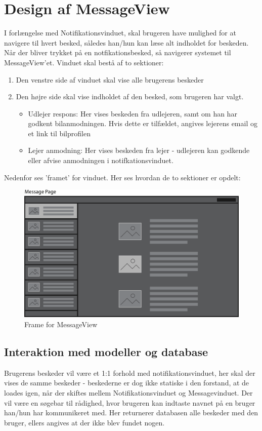 \documentclass[SoftwareDesign/SoftwareDesign_main.tex]{subfiles}
\begin{document}
\section{Design af MessageView}
I forlængelse med Notifikationsvinduet, skal brugeren have mulighed for at navigere til hvert besked, således han/hun kan læse alt indholdet for beskeden. Når der bliver trykket på en notfikationsbesked, så navigerer systemet til MessageView'et. Vinduet skal bestå af to sektioner: 
\begin{enumerate}
    \item Den venstre side af vinduet skal vise alle brugerens beskeder
    \item Den højre side skal vise indholdet af den besked, som brugeren har valgt.  
    \begin{itemize}
        \item Udlejer respons: Her vises beskeden fra udlejeren, samt om han har godkent bilanmodningen. Hvis dette er tilfældet, angives lejerens email og et link til bilprofilen
        \item Lejer anmodning: Her vises beskeden fra lejer - udlejeren kan godkende eller afvise anmodningen i notifkationsvinduet. 
    \end{itemize}
\end{enumerate}
Nedenfor ses 'framet' for vinduet. Her ses hvordan de to sektioner er opdelt: \\
\begin{figure}[H]
    \centering
    \includegraphics[width=\textwidth]{SoftwareDesign/MVVMDesigns/Graphics/MessageView.png}
    \caption{Frame for MessageView}
    \label{fig:wire_message}
\end{figure}

\subsection{Interaktion med modeller og database}
Brugerens beskeder vil være et 1:1 forhold med notifikationsvinduet, her skal der vises de samme beskeder - beskederne er dog ikke statiske i den forstand, at de loades igen, når der skiftes mellem Notifikationsvinduet og Messagevinduet. Der vil være en søgebar til rådighed, hvor brugeren kan indtaste navnet på en bruger han/hun har kommunikeret med. Her returnerer databasen alle beskeder med den bruger, ellers angives at der ikke blev fundet nogen. 
\end{document}
